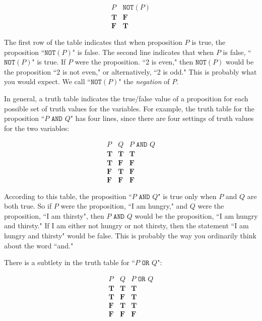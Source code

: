 \documentclass[11pt,oneside]{book}
\theoremstyle{definition}
\newcommand{\T}{\mathbf{T}}
\newcommand{\F}{\mathbf{F}}
\begin{document}
\[\begin{array}{c|c}
    P & \texttt{NOT}(P) \\
    \hline
    \T & \F \\
    \F & \T
\end{array}\]

The first row of the table indicates that when proposition $P$ is true, the proposition ``$\texttt{NOT}(P)$" is false.
The second line indicates that when $P$ is false, ``$\texttt{NOT}(P)$" is true.
If $P$ were the proposition. ``2 is even," then $\texttt{NOT}(P)$ would be the proposition ``2 is not even," or alternatively, ``2 is odd."
This is probably what you would expect.
We call ``$\texttt{NOT}(P)$" the \emph{negation} of $P$.

In general, a truth table indicates the true/false value of a proposition for each possible set of truth values for the variables.
For example, the truth table for the proposition ``$P \texttt{ AND } Q$" has four lines, since there are four settings of truth values for the two variables:

\[\begin{array}{c|c|c}
    P & Q & P \texttt{ AND } Q \\
    \hline
    \T & \T & \T \\
    \T & \F & \F \\
    \F & \T & \F \\
    \F & \F & \F
\end{array}\]

According to this table, the proposition ``$P \texttt{ AND } Q$" is true only when $P$ and $Q$ are both true.
So if $P$ were the proposition, ``I am hungry," and $Q$ were the proposition, ``I am thirsty", then $P \texttt{ AND } Q$ would be the proposition, ``I am hungry and thirsty."
If I am either not hungry or not thirsty, then the statement ``I am hungry and thirsty" would be false.
This is probably the way you ordinarily think about the word ``and."

There is a subtlety in the truth table for ``$P \texttt{ OR } Q$":

\[\begin{array}{c|c|c}
    P & Q & P \texttt{ OR } Q \\
    \hline
    \T & \T & \T \\
    \T & \F & \T \\
    \F & \T & \T \\
    \F & \F & \F \\
\end{array}\]
\end{document}
